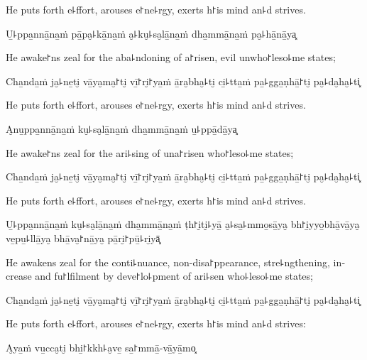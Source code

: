 \begin{english}
  He puts forth e꜕ffort, arouses e꜓ne꜕rgy, exerts h꜓is mind an꜕d strives.
\end{english}

U̱꜕ppa̱nnā̱na̱ṁ pā̱pa̮꜕kā̱na̱ṁ a̮꜕ku̮꜕sa̮lā̱na̱ṁ dha̱mmā̱na̱ṁ pa̮꜕hā̱nā̱ya͓

\begin{english}
  He awake꜓ns zeal for the aba꜕ndoning of a꜓risen, evil unwho꜓leso꜕me states;
\end{english}

Cha̱nda̱ṁ ja̮꜕ne̱ti̮ vā̱ya̮ma̮꜓ti̮ vī̱꜓ri̮꜓ya̱ṁ ā̱ra̮bha̮꜕ti̮ ci̱꜕tta̱ṁ pa̱꜕gga̱ṇhā̱꜓ti̮ pa̮꜕da̮ha̮꜕ti͓

\begin{english}
  He puts forth e꜕ffort, arouses e꜓ne꜕rgy, exerts h꜓is mind an꜕d strives.
\end{english}

A̮nu̱ppa̱nnā̱na̱ṁ ku̮꜕sa̮lā̱na̱ṁ dha̱mmā̱na̱ṁ u̱꜕ppā̱dā̱ya͓

\begin{english}
  He awake꜓ns zeal for the ari꜕sing of una꜓risen who꜓leso꜕me states;
\end{english}

Cha̱nda̱ṁ ja̮꜕ne̱ti̮ vā̱ya̮ma̮꜓ti̮ vī̱꜓ri̮꜓ya̱ṁ ā̱ra̮bha̮꜕ti̮ ci̱꜕tta̱ṁ pa̱꜕gga̱ṇhā̱꜓ti̮ pa̮꜕da̮ha̮꜕ti͓

\begin{english}
  He puts forth e꜕ffort, arouses e꜓ne꜕rgy, exerts h꜓is mind an꜕d strives.
\end{english}

\ifaivedition
\clearpage
\fi

U̱꜕ppa̱nnā̱na̱ṁ ku̮꜕sa̮lā̱na̱ṁ dha̱mmā̱na̱ṁ ṭh꜓i̮ti̮꜕yā̱ a̮꜕sa̱꜕mmo̱sā̱ya̮ bh꜓i̱yyo̱bhā̱vā̱ya̮ ve̱pu̱꜕llā̱ya̮ bhā̱va̮꜓nā̱ya̮ pā̱ri̮꜓pū̱꜕ri̮yā͓

\begin{english}
  He awakens zeal for the conti꜕nuance, non-disa꜓ppearance, stre꜕ngthening, increase and fu꜓lfilment by deve꜓lo꜕pment of ari꜕sen who꜕leso꜕me states;
\end{english}

Cha̱nda̱ṁ ja̮꜕ne̱ti̮ vā̱ya̮ma̮꜓ti̮ vī̱꜓ri̮꜓ya̱ṁ ā̱ra̮bha̮꜕ti̮ ci̱꜕tta̱ṁ pa̱꜕gga̱ṇhā̱꜓ti̮ pa̮꜕da̮ha̮꜕ti͓

\begin{english}
  He puts forth e꜕ffort, arouses e꜓ne꜕rgy, exerts h꜓is mind an꜕d strives:
\end{english}

A̮ya̱ṁ vu̱cca̮ti̮ bhi̱꜓kkh꜕a̮ve̱ sa̱꜓mmā̱-vā̱yā̱mo͓


